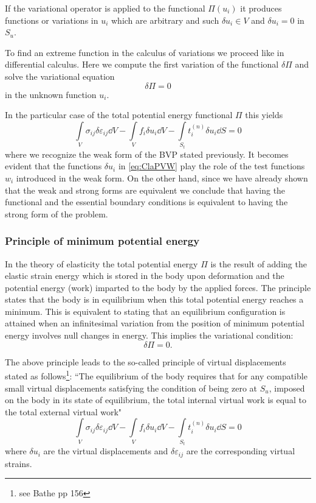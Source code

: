 If the variational operator is applied to the functional $\Pi (u_i)$ it produces functions or variations in $u_i$ which are arbitrary and such $\delta {u_i} \in V$ and $\delta {u_i} = 0$ in $S_u$.

To find an extreme function in the calculus of variations we proceed like in differential calculus. Here we compute the first variation of the functional $\delta \Pi$ and solve the variational equation
\begin{equation}\label{eq:vareq}
    \delta \Pi  = 0
\end{equation}
in the unknown function $u_i$. 

In the particular case of the total potential energy functional $\Pi$ this yields
\begin{equation}\label{eq:ClaPVW}
    \int\limits_V \sigma _{ij}\delta \varepsilon_{ij}\dd V  - \int\limits_V f_i \delta u_i \dd V  - \int\limits_{S_t} t_i^{(n)} \delta u_i\dd S  = 0
\end{equation}
where we recognize the weak form of the BVP stated previously. It becomes evident that the functions $\delta {u_i}$ in \cref{eq:ClaPVW} play the role of the test functions $w_i$ introduced in the weak form. On the other hand, since we have already shown that the weak and strong forms are equivalent we conclude that having the functional and the essential boundary conditions is equivalent to having the strong form of the problem.


\subsubsection*{Principle of minimum potential energy}
In the theory of elasticity the total potential energy $\Pi$ is the result of adding the elastic strain energy which is stored in the body upon deformation and the potential energy (work) imparted to the body by the applied forces. The principle states that the body is in equilibrium when this total potential energy reaches a minimum. This is equivalent to stating that an equilibrium configuration is attained when an infinitesimal variation from the position of minimum potential energy involves null changes in energy. This implies the variational condition:
\begin{equation}\label{vareq2}
    \delta \Pi  = 0.
\end{equation}

The above principle leads to the so-called principle of virtual displacements stated as follows\footnote{see Bathe pp 156}:
``The equilibrium of the body requires that for any compatible small virtual displacements satisfying the condition of being zero at $S_u$, imposed on the body in its state of equilibrium, the total internal virtual work is equal to the total external virtual work"
\[\int\limits_V \sigma _{ij}\delta \varepsilon_{ij}\dd V  - \int\limits_V f_i\delta u_i\dd V  - \int\limits_{S_t} t_i^{(n)}\delta u_i\dd S  = 0\]
where $\delta {u_i}$ are the virtual displacements and $\delta \varepsilon_{ij}$ are the corresponding virtual strains.

